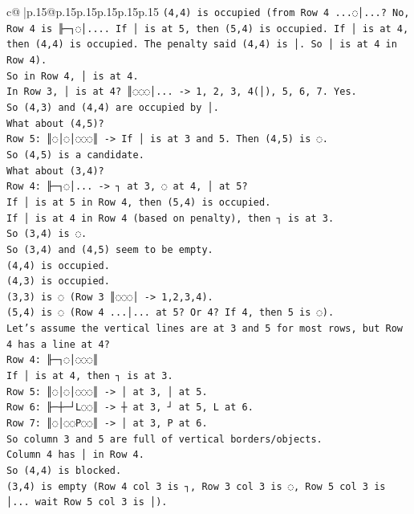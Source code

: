 \documentclass{article}
\begin{document}
{\begin{supertabular}{c@{$\;$}|p{.15\linewidth}@{}p{.15\linewidth}p{.15\linewidth}p{.15\linewidth}p{.15\linewidth}p{.15\linewidth}}
{{{\texttt{(4,4) is occupied (from Row 4 ...◌│...? No, Row 4 is ╟─┐◌│.... If │ is at 5, then (5,4) is occupied. If │ is at 4, then (4,4) is occupied. The penalty said (4,4) is │. So │ is at 4 in Row 4).} \\
\texttt{So in Row 4, │ is at 4.} \\
\texttt{In Row 3, │ is at 4? ║◌◌◌│... {-}> 1, 2, 3, 4(│), 5, 6, 7. Yes.} \\
\texttt{So (4,3) and (4,4) are occupied by │.} \\
\texttt{What about (4,5)?} \\
\texttt{Row 5: ║◌│◌│◌◌◌║ {-}> If │ is at 3 and 5. Then (4,5) is ◌.} \\
\texttt{So (4,5) is a candidate.} \\
\texttt{What about (3,4)?} \\
\texttt{Row 4: ╟─┐◌│... {-}> ┐ at 3, ◌ at 4, │ at 5?} \\
\texttt{If │ is at 5 in Row 4, then (5,4) is occupied.} \\
\texttt{If │ is at 4 in Row 4 (based on penalty), then ┐ is at 3.} \\
\texttt{So (3,4) is ◌.} \\
\texttt{So (3,4) and (4,5) seem to be empty.} \\
\texttt{(4,4) is occupied.} \\
\texttt{(4,3) is occupied.} \\
\texttt{(3,3) is ◌ (Row 3 ║◌◌◌│ {-}> 1,2,3,4).} \\
\texttt{(5,4) is ◌ (Row 4 ...│... at 5? Or 4? If 4, then 5 is ◌).} \\
\texttt{Let's assume the vertical lines are at 3 and 5 for most rows, but Row 4 has a line at 4?} \\
\texttt{Row 4: ╟─┐◌│◌◌◌║} \\
\texttt{If │ is at 4, then ┐ is at 3.} \\
\texttt{Row 5: ║◌│◌│◌◌◌║ {-}> │ at 3, │ at 5.} \\
\texttt{Row 6: ╟─┼─┘L◌◌║ {-}> ┼ at 3, ┘ at 5, L at 6.} \\
\texttt{Row 7: ║◌│◌◌P◌◌║ {-}> │ at 3, P at 6.} \\
\texttt{So column 3 and 5 are full of vertical borders/objects.} \\
\texttt{Column 4 has │ in Row 4.} \\
\texttt{So (4,4) is blocked.} \\
\texttt{(3,4) is empty (Row 4 col 3 is ┐, Row 3 col 3 is ◌, Row 5 col 3 is │... wait Row 5 col 3 is │).} \\
}}}
\end{supertabular}}
\end{document}
